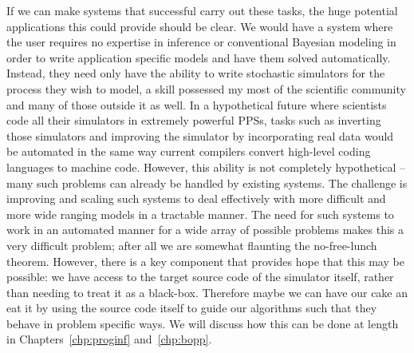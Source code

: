 If we can make systems that successful carry out these tasks, 
the huge potential applications this could provide should be clear. We would have a 
system where the user requires no expertise in inference or conventional
Bayesian modeling in order to write application specific models and have them solved automatically.
Instead, they need only have the ability to write stochastic simulators for the process they wish to
model, a skill possessed my most of the scientific community and many of those outside it as well.
In a hypothetical future where scientists
code all their simulators in extremely powerful PPSs, tasks such as
inverting those simulators and improving the simulator by incorporating real data would
be automated in the same way current compilers convert high-level coding languages to machine code.  
However, this ability is not completely
hypothetical -- many such problems can already be handled by existing systems.  The challenge
is improving and scaling such systems to deal effectively with more difficult and more wide ranging models
in a tractable manner.  The need for such systems to work in an automated manner for a wide array
of possible problems makes this a very difficult problem; after all we are somewhat flaunting the no-free-lunch
theorem.  However, there is a key component that provides hope that this may be possible: we have access
to the target source code of the simulator itself, rather than needing to treat it as a black-box.  Therefore
maybe we can have our cake an eat it by using the source code itself to guide our algorithms such that
they behave in problem specific ways.  We will discuss how this can be done at length in 
Chapters~\ref{chp:proginf} and~\ref{chp:bopp}.